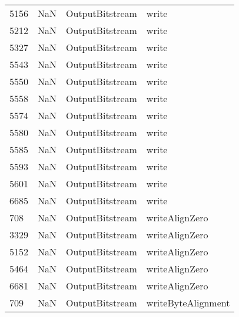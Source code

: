 \begin{tabular}{llll}
5156 &                   NaN &            OutputBitstream &                                     write \\
5212 &                   NaN &            OutputBitstream &                                     write \\
5327 &                   NaN &            OutputBitstream &                                     write \\
5543 &                   NaN &            OutputBitstream &                                     write \\
5550 &                   NaN &            OutputBitstream &                                     write \\
5558 &                   NaN &            OutputBitstream &                                     write \\
5574 &                   NaN &            OutputBitstream &                                     write \\
5580 &                   NaN &            OutputBitstream &                                     write \\
5585 &                   NaN &            OutputBitstream &                                     write \\
5593 &                   NaN &            OutputBitstream &                                     write \\
5601 &                   NaN &            OutputBitstream &                                     write \\
6685 &                   NaN &            OutputBitstream &                                     write \\
708  &                   NaN &            OutputBitstream &                            writeAlignZero \\
3329 &                   NaN &            OutputBitstream &                            writeAlignZero \\
5152 &                   NaN &            OutputBitstream &                            writeAlignZero \\
5464 &                   NaN &            OutputBitstream &                            writeAlignZero \\
6681 &                   NaN &            OutputBitstream &                            writeAlignZero \\
709  &                   NaN &            OutputBitstream &                        writeByteAlignment \\

\end{tabular}
